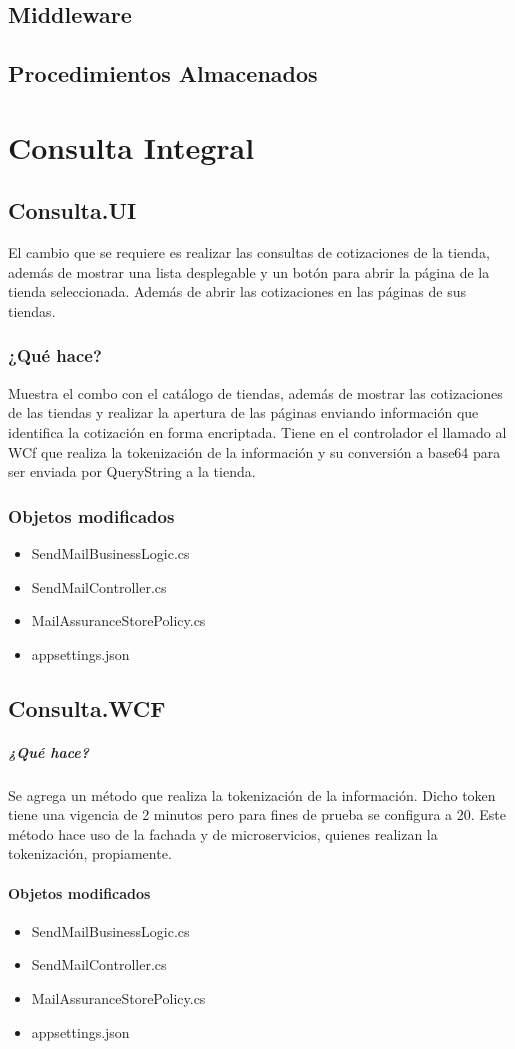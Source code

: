 \documentclass[12pt]{book} %
\begin{document}
\chapter{Middleware}

\chapter{Procedimientos Almacenados}

\part{Consulta Integral}

\chapter{Consulta.UI}
El cambio que se requiere es realizar las consultas de cotizaciones de la tienda, además de mostrar una lista desplegable y un botón para abrir la página de la tienda seleccionada. Además de abrir las cotizaciones en las páginas de sus tiendas.

\section{¿Qué hace?}
Muestra el combo con el catálogo de tiendas, además de mostrar las cotizaciones de las tiendas y realizar la apertura de las páginas enviando información que identifica la cotización en forma encriptada. Tiene en el controlador el llamado al WCf que realiza la tokenización de la información y su conversión a base64 para ser enviada por QueryString a la tienda.
\section{Objetos modificados}
\begin{itemize}
\item SendMailBusinessLogic.cs
\item SendMailController.cs
\item MailAssuranceStorePolicy.cs
\item appsettings.json
\end{itemize}

\chapter{Consulta.WCF}

\subsubsection{¿Qué hace?}
Se agrega un método que realiza la tokenización de la información. Dicho token tiene una vigencia de 2 minutos pero para fines de prueba se configura a 20. Este método hace uso de la fachada y de microservicios, quienes realizan la tokenización, propiamente.
\subsection{Objetos modificados}
\begin{itemize}
\item SendMailBusinessLogic.cs
\item SendMailController.cs
\item MailAssuranceStorePolicy.cs
\item appsettings.json
\end{itemize}
\end{document}
